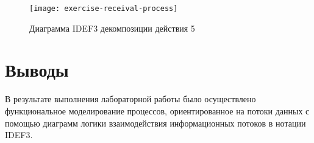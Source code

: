 \documentclass[a4paper,14pt]{extarticle}
\begin{document}
\begin{figure}[H]
    \centering
    \texttt{[image: exercise-receival-process]}
    \caption{Диаграмма IDEF3 декомпозиции действия 5}
    \label{fig:exercise-receival-process}
\end{figure}

\section*{Выводы}
В результате выполнения лабораторной работы было осуществлено функциональное
моделирование процессов, ориентированное на потоки данных с помощью диаграмм
логики взаимодействия информационных потоков в нотации IDEF3.
\end{document}
